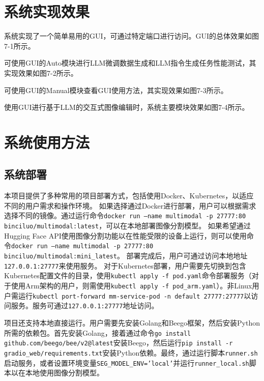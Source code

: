 \documentclass[a4paper,AutoFakeBold,oneside,12pt]{book}
\begin{document}
\section{系统实现效果}
系统实现了一个简单易用的GUI，可通过特定端口进行访问。GUI的总体效果如图7-1所示。

可使用GUI的Auto模块进行LLM微调数据生成和LLM指令生成任务性能测试，其实现效果如图7-2所示。

可使用GUI的Manual模块查看GUI使用方法，其实现效果如图7-3所示。

使用GUI进行基于LLM的交互式图像编辑时，系统主要模块效果如图7-4所示。



\newpage

\section{系统使用方法}
\subsection{系统部署}
本项目提供了多种常用的项目部署方式，包括使用Docker、Kubernetes，以适应不同的用户需求和操作环境。
如果选择通过Docker进行部署，用户可以根据需求选择不同的镜像。通过运行命令\texttt{docker run --name multimodal -p 27777:80 binciluo/multimodal:latest}，可以在本地部署图像分割模型。
如果希望通过Hugging Face API使用图像分割功能以在性能受限的设备上运行，则可以使用命令\texttt{docker run --name multimodal -p 27777:80 binciluo/multimodal:mini\_latest}。
部署完成后，用户可通过访问本地地址\texttt{127.0.0.1:27777}来使用服务。
对于Kubernetes部署，用户需要先切换到包含Kubernetes配置文件的目录，使用\texttt{kubectl apply -f pod.yaml}命令部署服务（对于使用Arm架构的用户，则需使用\texttt{kubectl apply -f pod\_arm.yaml}）。非Linux用户需运行\texttt{kubectl port-forward mm-service-pod -n default 27777:27777}以访问服务。服务可通过\texttt{127.0.0.1:27777}地址访问。

项目还支持本地直接运行。用户需要先安装Golang和Beego框架，然后安装Python所需的依赖包。首先安装Golang，接着通过命令\texttt{go install github.com/beego/bee/v2@latest}安装Beego，然后运行\texttt{pip install -r gradio\_web/requirements.txt}安装Python依赖。最终，通过运行脚本\texttt{runner.sh}启动服务，或者设置环境变量\texttt{SEG\_MODEL\_ENV='local'}并运行\texttt{runner\_local.sh}脚本以在本地使用图像分割模型。
\end{document}
